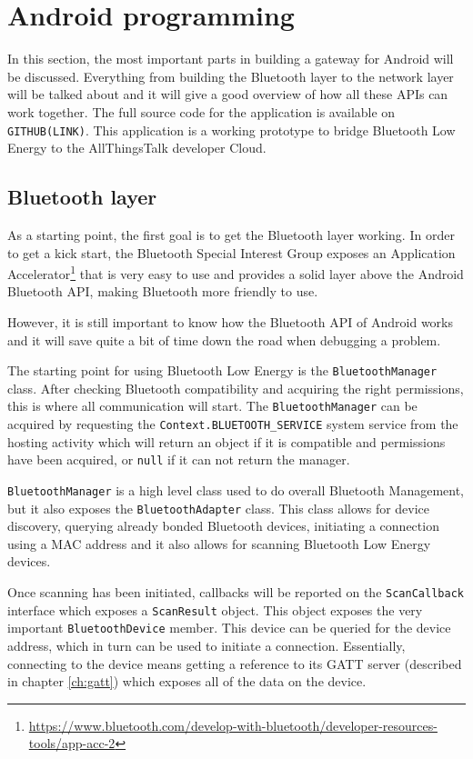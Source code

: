 \documentclass[pdftex,a4paper,12pt,twoside]{report}
\begin{document}
\section{Android programming}
\label{sec:androidprogramming}
In this section, the most important parts in building a gateway for Android will be discussed. Everything from building the Bluetooth layer to the network layer will be talked about and it will give a good overview of how all these APIs can work together. The full source code for the application is available on \texttt{GITHUB(LINK)}. This application is a working prototype to bridge Bluetooth Low Energy to the AllThingsTalk developer Cloud.

\subsection{Bluetooth layer}
\label{subsec:bluetoothlayer}
As a starting point, the first goal is to get the Bluetooth layer working. In order to get a kick start, the Bluetooth Special Interest Group exposes an Application Accelerator\footnote{\url{https://www.bluetooth.com/develop-with-bluetooth/developer-resources-tools/app-acc-2}} that is very easy to use and provides a solid layer above the Android Bluetooth API, making Bluetooth more friendly to use.

However, it is still important to know how the Bluetooth API of Android works and it will save quite a bit of time down the road when debugging a problem.

The starting point for using Bluetooth Low Energy is the \texttt{BluetoothManager} class. After checking Bluetooth compatibility and acquiring the right permissions, this is where all communication will start. The \texttt{BluetoothManager} can be acquired by requesting the \texttt{Context.BLUETOOTH\_SERVICE} system service from the hosting activity which will return an object if it is compatible and permissions have been acquired, or \texttt{null} if it can not return the manager.

\texttt{BluetoothManager} is a high level class used to do overall Bluetooth Management, but it also exposes the \texttt{BluetoothAdapter} class. This class allows for device discovery, querying already bonded Bluetooth devices, initiating a connection using a MAC address and it also allows for scanning Bluetooth Low Energy devices.

Once scanning has been initiated, callbacks will be reported on the \texttt{ScanCallback} interface which exposes a \texttt{ScanResult} object. This object exposes the very important \texttt{BluetoothDevice} member. This device can be queried for the device address, which in turn can be used to initiate a connection. Essentially, connecting to the device means getting a reference to its GATT server (described in chapter \ref{ch:gatt}) which exposes all of the data on the device.
\end{document}
